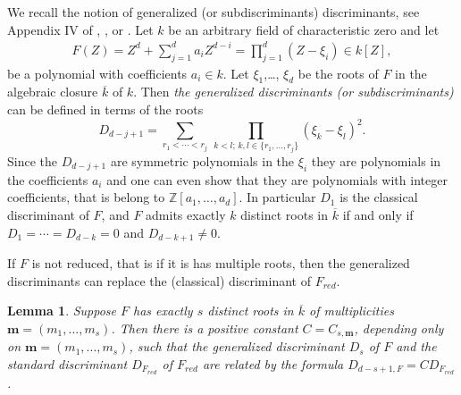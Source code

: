 \documentclass[11pt,a4paper]{amsart}
\newcommand{\1}{{1\!\!1}}
\numberwithin{equation}{section}
\theoremstyle{plain}%
\newtheorem{lemma}[thm]{Lemma}
\theoremstyle{definition}
\theoremstyle{definition}
\theoremstyle{remark}
\newcommand{\Z}{\mathbb{Z}}
\newcommand{\kk}{{k}}
\renewcommand{\1}{\mathbf{1}}
\newcommand{\unt}{$\nu$-transverse }
\begin{document}
We recall the notion of generalized (or subdiscriminants) discriminants, see Appendix IV of \cite{whitneybook}, \cite{BPRbook}, \cite{roy2006} or \cite{MR4367438}. 
Let $\kk$ be an arbitrary field of characteristic zero and let 
\begin{align}\label{type}
F(Z) = Z^d + \sum_{j=1}^ d a_iZ^{d-i} = \prod_{j=1}^d (Z-\xi_i)\in \kk [Z], 
\end{align}
be a polynomial with coefficients $a_i\in \kk$.  Let $\xi_1$,\ldots, $\xi_d$ be the roots of $F$ in the algebraic closure $\overline \kk$ of $\kk$.  Then \emph{the generalized discriminants (or subdiscriminants)} 
can be defined in terms of the roots 
$$
D_{d-j+1} =  \sum_{r_1 <\cdots < r_{j}} \,  \prod_{k< l;\, k,l \in \{r_1, \ldots ,r_{j}\}}  (\xi_k-\xi_l)^2. 
$$
Since the $D_{d-j+1}$ are symmetric polynomials in the $\xi_i$ they are polynomials in the coefficients $a_i$ and one can even show that they are polynomials with integer coefficients, that is belong to $\Z[a_1, \ldots, a_d]$.  
In particular $D_1$ is the classical discriminant of $F$, and $F$ admits exactly $k$ distinct roots in $\overline \kk$ if and only if $D_{1} = \cdots = D_{d-k}=0$ and 
$D_{d-k+1} \ne 0$.

If $F$ is not reduced, that is if it is has multiple roots, then the generalized discriminants can replace the (classical) discriminant of $F_{red}$.   

\begin{lemma}\label{lem:twodiscr} 
Suppose $F$ has exactly $s$ distinct roots in 
$\overline {\kk}$ of multiplicities $\mathbf m=(m_1, ..., m_s)$.  Then there is a positive constant $C= C_{s,\mathbf m}$, depending only on 
$\mathbf m=(m_1, ..., m_s)$, such that  the generalized discriminant $D_{s}$ of $F$ and 
the standard discriminant $D_{F_{red}}$ of $F_{red}$ are related by the formula $D_{d-s+1,F}= C D_{F_{red}}$. 
\end{lemma}










\end{document}
